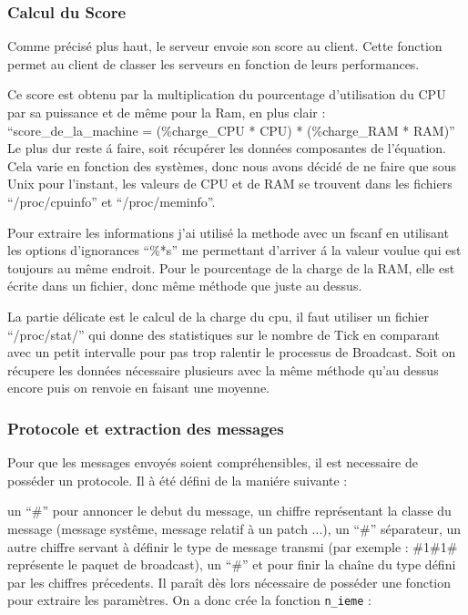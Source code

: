 \documentclass[14pt,a4paper]{report}
\begin{document}
\subsubsection{Calcul du Score}

Comme pr\'ecis\'e plus haut, le serveur envoie son score au client. Cette 
fonction permet au client de classer les serveurs en fonction de leurs 
performances.

Ce score est obtenu par la multiplication du pourcentage d'utilisation du CPU 
par sa puissance et de m\^eme pour la Ram, en plus clair :
\\
``score\_de\_la\_machine = (\%charge\_CPU * CPU) * (\%charge\_RAM * RAM)''
\\
Le plus dur reste \'a faire, soit r\'ecup\'erer les donn\'ees composantes de 
l'\'equation. Cela varie en fonction des syst\`emes, donc nous avons d\'ecid\'e
de ne faire que sous Unix pour l'instant, les valeurs de CPU et de RAM se 
trouvent dans les fichiers ``/proc/cpuinfo'' et ``/proc/meminfo''.

Pour extraire les informations j'ai utilis\'e la methode avec
un fscanf en utilisant les 
options d'ignorances ``\%*s'' me permettant d'arriver \'a la valeur voulue
qui est
toujours au m\^eme endroit. Pour le pourcentage de la charge de la RAM, elle 
est \'ecrite dans un fichier, donc m\^eme m\'ethode que juste au dessus.

 La partie d\'elicate est le calcul de la charge du cpu, il faut utiliser un 
fichier ``/proc/stat/'' qui donne des statistiques sur le nombre de Tick en 
comparant avec un petit intervalle pour pas trop ralentir le processus de 
Broadcast. Soit on r\'ecupere les donn\'ees n\'ecessaire plusieurs avec la
 m\^eme m\'ethode qu'au dessus encore puis on renvoie en faisant une moyenne.
\\


\subsubsection{Protocole et extraction des messages}

Pour que les messages envoy\'es soient compr\'ehensibles, il est necessaire de 
poss\'eder un protocole.
Il \`a \'et\'e d\'efini de la mani\'ere suivante :

un ``\#'' pour annoncer le debut du message, un chiffre repr\'esentant
la classe
du message (message syst\^eme, message relatif \`a un patch ...), un ``\#'' 
s\'eparateur, un autre chiffre servant \`a d\'efinir le type de message
transmi
(par exemple : \#1\#1\# repr\'esente le paquet de broadcast), un ``\#'' et
pour finir la cha\^ine du type d\'efini par les chiffres pr\'ecedents.
Il para\^it d\`es lors n\'ecessaire de poss\'eder une fonction pour
extraire les 
param\`etres. On a donc cr\'ee la fonction {\tt n\_ieme} :
\end{document}
